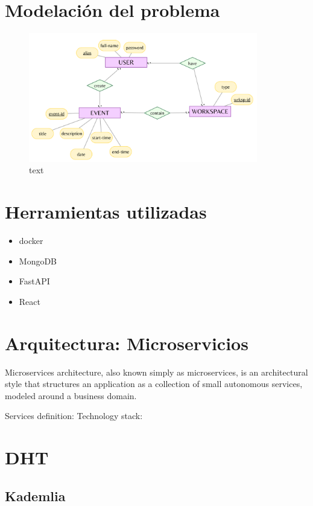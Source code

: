 \documentclass[10pt]{article} %
\begin{document}
	\section{Modelaci\'on del problema}
	
	\begin{figure}[H]
		\centering
		\includegraphics[width=10cm]{merx.png}
		\caption{text}
	\end{figure}
	
	\section{Herramientas utilizadas}
	
	\begin{itemize}
		\item docker
		\item MongoDB
		\item FastAPI
		\item React
	\end{itemize}
	
	\section{Arquitectura: Microservicios}
	
	Microservices architecture, also known simply as microservices, is an architectural style that structures an application as a collection of small autonomous services, modeled around a business domain.
	
	Services definition:
	Technology stack:
	
	\section{DHT}
	
	\subsection{Kademlia}
	
\end{document}
